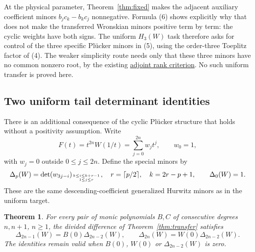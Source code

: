 \documentclass[11pt]{article}
\newtheorem{theorem}{Theorem}
\begin{document}
At the physical parameter, Theorem~\ref{thm:fixed} makes the
adjacent auxiliary coefficient minors $b_jc_k-b_kc_j$ nonnegative.
Formula (6) shows explicitly why that does not make the transferred
Wronskian minors positive term by term: the cyclic weights have both
signs. The uniform $H_3(W)$ task therefore asks for control of the
three specific Pl\"ucker minors in (5), using the order-three
Toeplitz factor of (4). The weaker simplicity route needs only that
these three minors have no common nonzero root, by the existing
\href{HIGHER_GAP_ADJOINT_RANK.tex}{adjoint rank criterion}.
No such uniform transfer is proved here.

\subsection*{Two uniform tail determinant identities}
There is an additional consequence of the cyclic Pl\"ucker structure
that holds without a positivity assumption. Write
\[
 F(t)=t^{2n}W(1/t)=\sum_{j=0}^{2n}w_jt^j,\qquad w_0=1,
\]
with $w_j=0$ outside $0\le j\le2n$. Define the special minors by
\[
 \Delta_p(W)=\det(w_{3j-i})_{{k\le i\le k+r-1}\atop{1\le j\le r}},
 \quad r=\lceil p/2\rceil,\quad k=2r-p+1,
 \qquad \Delta_0(W)=1.
\]
These are the same descending-coefficient generalized Hurwitz minors
as in the uniform target.
\begin{theorem}\label{thm:tail}
For every pair of monic polynomials $B,C$ of consecutive degrees
$n,n+1$, $n\ge1$, the divided difference of Theorem~\ref{thm:transfer}
satisfies
\[
 \Delta_{2n-1}(W)=B(0)\Delta_{2n-2}(W),\qquad
 \Delta_{2n}(W)=W(0)\Delta_{2n-2}(W).                       \tag{7}
\]
The identities remain valid when $B(0)$, $W(0)$ or
$\Delta_{2n-2}(W)$ is zero.
\end{theorem}
\end{document}

